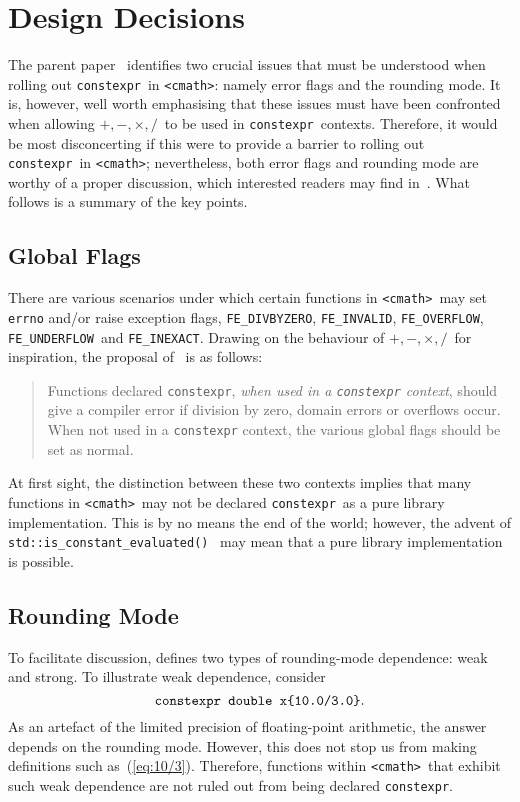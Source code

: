 \documentclass[prd,twocolumn,amsmath,amssymb,nofootinbib,eqsecnum]{revtex4-1}
\newcommand{\constexpr}{\code{constexpr}\xspace}
\newcommand{\code}[1]{{\tt #1}}
\newcommand{\header}[1]{{\tt <#1>}}
\newcommand{\cmath}{\header{cmath}}
\newcommand{\FEINVALID}{{\tt FE\_INVALID}}
\newcommand{\FEDIVBYZERO}{{\tt FE\_DIVBYZERO}}
\newcommand{\FEINEXACT}{{\tt FE\_INEXACT}}
\newcommand{\FEUNDERFLOW}{{\tt FE\_UNDERFLOW}}
\newcommand{\FEOVERFLOW}{{\tt FE\_OVERFLOW}}
\newcommand{\Operators}{\ensuremath{+,-,\times,/}}
\newcommand{\eq}[1]{(\ref{eq:#1})}
\begin{document}
\section{Design Decisions}

The parent paper~\cite{Rosten-constexpr} identifies two crucial issues that must be understood when rolling out \constexpr\ in \cmath: namely error flags and the rounding mode. It is, however, well worth emphasising that these issues must have been confronted when allowing \Operators\ to be used in \constexpr\ contexts. Therefore, it would be most disconcerting if this were to provide a barrier to rolling out \constexpr\ in \cmath; nevertheless, both error flags and rounding mode are worthy of a proper discussion, which interested readers may find in~\cite{Rosten-constexpr}. What follows is a summary of the key points.

\subsection{Global Flags}

There are various scenarios under which certain functions in \cmath\ may set \code{errno} and/or raise exception flags, \FEDIVBYZERO, \FEINVALID, \FEOVERFLOW, \FEUNDERFLOW\ and
\FEINEXACT. Drawing on the behaviour of \Operators\ for inspiration, the proposal of~\cite{Rosten-constexpr} is as follows:
\begin{quotation}
	Functions declared \constexpr, \emph{when used in a \constexpr
context}, should give a compiler error if division by zero, domain errors or
overflows occur. When not used in a \constexpr context, the various global
flags should be set as normal.
\end{quotation}
At first sight, the distinction between these two contexts implies that many functions in \cmath\ may not be declared \constexpr\ as a pure library implementation. This is by no means the end of the world; however, the advent of \code{std::is\_constant\_evaluated()}~\cite{ConstEval}
may mean that a pure library implementation is possible.

\subsection{Rounding Mode}
\label{sec:rounding}

To facilitate discussion, \cite{Rosten-constexpr} defines two types of rounding-mode dependence: weak and strong. To illustrate weak dependence, consider
\begin{equation}
	\mbox{\code{constexpr double x\{10.0/3.0\}}}.
\label{eq:10/3}
\end{equation}
As an artefact of the limited precision of floating-point arithmetic, the answer depends on the rounding mode. However, this does not stop us from making definitions such as~\eq{10/3}. Therefore, functions  within \cmath\ that exhibit such weak dependence are not ruled out from being declared \constexpr.
\end{document}
